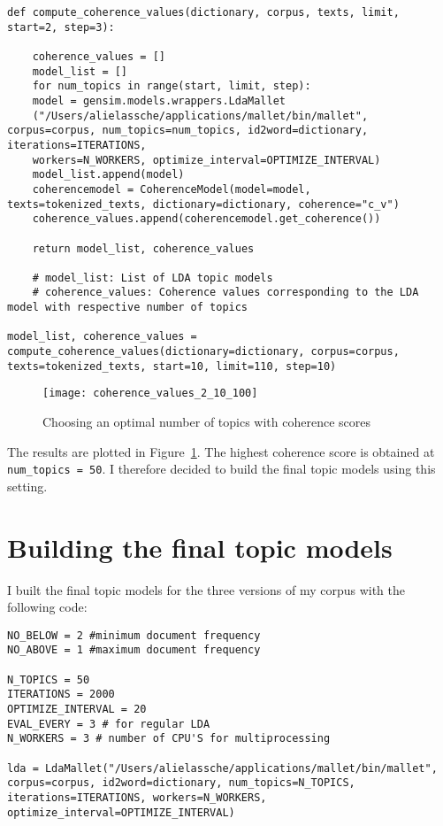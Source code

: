 \begin{lstlisting}
def compute_coherence_values(dictionary, corpus, texts, limit, start=2, step=3):

	coherence_values = []
	model_list = []
	for num_topics in range(start, limit, step):
	model = gensim.models.wrappers.LdaMallet
	("/Users/alielassche/applications/mallet/bin/mallet", corpus=corpus, num_topics=num_topics, id2word=dictionary, iterations=ITERATIONS,  
	workers=N_WORKERS, optimize_interval=OPTIMIZE_INTERVAL)
	model_list.append(model)
	coherencemodel = CoherenceModel(model=model, texts=tokenized_texts, dictionary=dictionary, coherence="c_v")
	coherence_values.append(coherencemodel.get_coherence())
	
	return model_list, coherence_values
	
	# model_list: List of LDA topic models
	# coherence_values: Coherence values corresponding to the LDA model with respective number of topics
	
model_list, coherence_values = compute_coherence_values(dictionary=dictionary, corpus=corpus, texts=tokenized_texts, start=10, limit=110, step=10)
\end{lstlisting}

\begin{figure}[hbt!]
	\centering
	\texttt{[image: coherence\_values\_2\_10\_100]}
	\caption{Choosing an optimal number of topics with coherence scores}
	\label{fig:ChoosingTopicsWithCS}
\end{figure}

\noindent The results are plotted in Figure~\ref{fig:ChoosingTopicsWithCS}. The highest coherence score is obtained at \texttt{num\_topics = 50}. I therefore decided to build the final topic models using this setting. 

\section{Building the final topic models}
I built the final topic models for the three versions of my corpus with the following code:

\begin{lstlisting}
NO_BELOW = 2 #minimum document frequency
NO_ABOVE = 1 #maximum document frequency

N_TOPICS = 50
ITERATIONS = 2000
OPTIMIZE_INTERVAL = 20
EVAL_EVERY = 3 # for regular LDA 
N_WORKERS = 3 # number of CPU'S for multiprocessing

lda = LdaMallet("/Users/alielassche/applications/mallet/bin/mallet", 
corpus=corpus, id2word=dictionary, num_topics=N_TOPICS, iterations=ITERATIONS, workers=N_WORKERS, optimize_interval=OPTIMIZE_INTERVAL)
\end{lstlisting}

